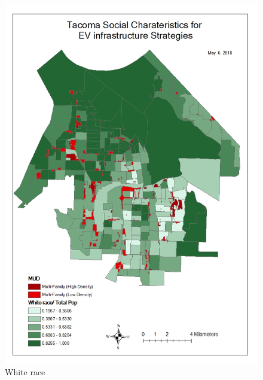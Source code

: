 \documentclass[]{article}
\begin{document}
\begin{figure}
\centering
\includegraphics{./figs/race.jpg}
\caption{White race}
\end{figure}
\end{document}

